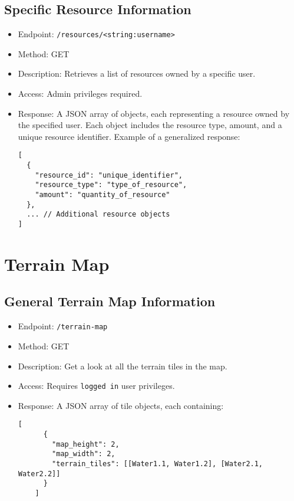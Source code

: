 \documentclass[12pt]{article}
\begin{document}
\subsection{Specific Resource Information}
\begin{itemize}
    \item Endpoint: \texttt{/resources/<string:username>}
    \item Method: GET
    \item Description: Retrieves a list of resources owned by a specific user.
    \item Access: Admin privileges required.
    \item Response: A JSON array of objects, each representing a resource owned by the specified user. Each object includes the resource type, amount, and a unique resource identifier. Example of a generalized response:
    \begin{verbatim}
[
  {
    "resource_id": "unique_identifier",
    "resource_type": "type_of_resource",
    "amount": "quantity_of_resource"
  },
  ... // Additional resource objects
]
    \end{verbatim}
\end{itemize}

\section{Terrain Map}

\subsection{General Terrain Map Information}
\begin{itemize}
    \item Endpoint: \texttt{/terrain-map}
    \item Method: GET
    \item Description: Get a look at all the terrain tiles in the map.
    \item Access: Requires \texttt{logged in} user privileges.
    \item Response: A JSON array of tile objects, each containing:
    \begin{lstlisting}[breaklines]
    [
      {
        "map_height": 2,
        "map_width": 2,
        "terrain_tiles": [[Water1.1, Water1.2], [Water2.1, Water2.2]]
      }
    ]
    \end{lstlisting}
\end{itemize}
\end{document}
